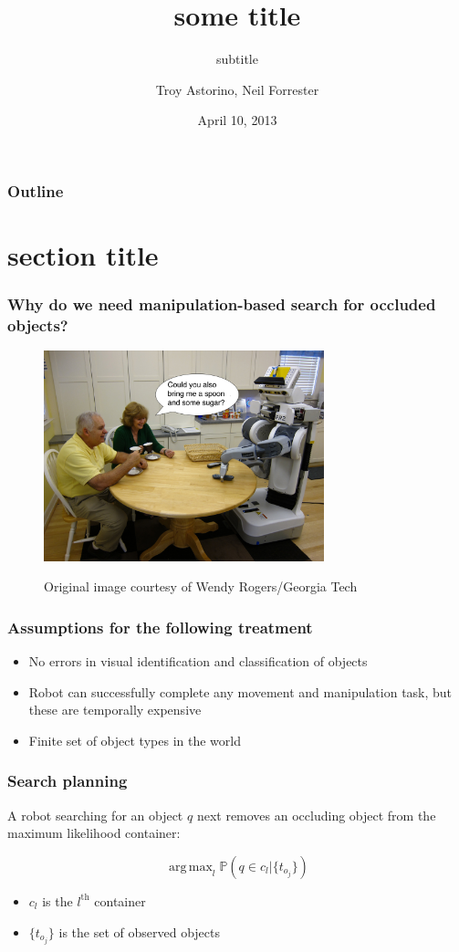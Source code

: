 \documentclass{beamer}
\title{some title}
\subtitle{subtitle}
\author{Troy Astorino, Neil Forrester}
\date{April 10, 2013}
\institute[6.834 -- MIT]{Cognitive Robotics \\ Massachusetts Institute of Technology}
\DeclareMathOperator*{\argmax}{arg\,max}
\begin{document}
\begin{frame}
  \maketitle
\end{frame}

\begin{frame}
  \frametitle{Outline}
  \tableofcontents
\end{frame}

\section{section title}
\begin{frame}
  \frametitle{Why do we need manipulation-based search for occluded
    objects?}
  \begin{figure}
    \centering
    \includegraphics[width=3.2in]{img/robot_in_kitchen.jpg}

    \tiny{Original image courtesy of Wendy Rogers/Georgia Tech}
  \end{figure}
\end{frame}

\begin{frame}
  \frametitle{Assumptions for the following treatment}
  \begin{itemize}
  \item No errors in  visual identification and classification of objects
  \item Robot can successfully complete any movement and manipulation task, but
    these are temporally expensive
  \item Finite set of object types in the world
  \end{itemize}
\end{frame}

\begin{frame}
  \frametitle{Search planning}
  A robot searching for an object $q$ next removes an occluding object
  from the maximum likelihood container:

  \[\argmax_l{\mathbb{P}(q \in c_l|\{t_{o_j}\})}\]
  
  \begin{itemize}
  \item $c_l$ is the $l^{\text{th}}$ container
  \item $\{t_{o_j}\}$ is the set of observed objects
  \end{itemize}
\end{frame}
\end{document}
